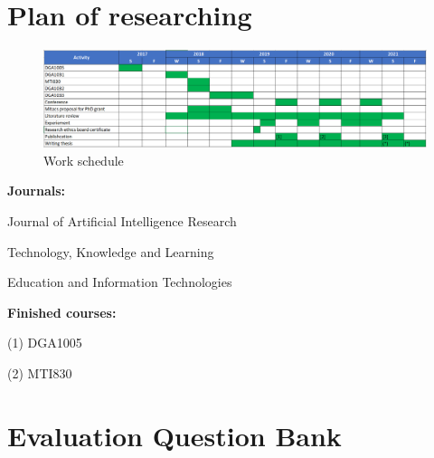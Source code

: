 \documentclass[letterpaper%
, twoside%
, 12pt%
,these%
, english%
,creativecommons,hyperref, withAlgo2e %
]{thETS}
\begin{document}
\begin{appendices}
	\chapter {Plan of researching}

\begin{figure}
	
	
		\includegraphics[width=\textwidth]{Figures/plan2.png}
	
	\caption{Work schedule}
\end{figure}

		\textbf{Journals:}
		\par [1] Journal of Artificial Intelligence Research 
		\par [2] Technology, Knowledge and Learning
		\par [3] Education and Information Technologies
		

		\textbf{Finished courses:}
		\par (1) DGA1005
		\par (2) MTI830
		



	\chapter{Evaluation Question Bank}
     
 
  
   

     
     


     
\end{appendices}
\end{document}
